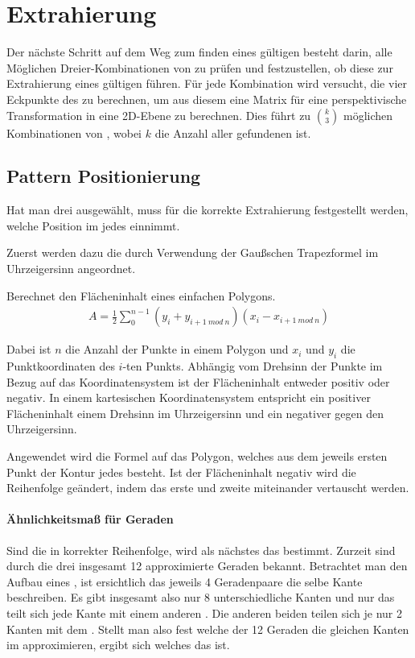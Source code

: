 \chapter{Extrahierung}

Der nächste Schritt auf dem Weg zum finden eines gültigen \QRCodes besteht darin, alle Möglichen Dreier-Kombinationen von \fps zu prüfen und festzustellen, ob diese zur Extrahierung eines gültigen \QRCodes führen. Für jede Kombination wird versucht, die vier Eckpunkte des \QRCodes zu berechnen, um aus diesem eine Matrix für eine perspektivische Transformation in eine 2D-Ebene zu berechnen. Dies führt zu $\binom{k}{3}$ möglichen Kombinationen von \fps, wobei $k$ die Anzahl aller gefundenen \fps ist.

\section{Pattern Positionierung}
Hat man drei \fps ausgewählt, muss für die korrekte Extrahierung festgestellt werden, welche Position im \QRCode jedes \fp einnimmt.

Zuerst werden dazu die \fps durch Verwendung der Gaußschen Trapezformel im Uhrzeigersinn angeordnet.
\begin{theorem}
Berechnet den Flächeninhalt eines einfachen Polygons.
\begin{align}
A=\frac{1}{2} \sum_{0}^{n-1} (y_i + y_{i+1\ mod\ n})(x_i - x_{i+1\ mod\ n})
\end{align}
\end{theorem}
Dabei ist $n$ die Anzahl der Punkte in einem Polygon und $x_i$ und $y_i$ die Punktkoordinaten des $i$-ten Punkts. Abhängig vom Drehsinn der Punkte im Bezug auf das Koordinatensystem ist der Flächeninhalt entweder positiv oder negativ. In einem kartesischen Koordinatensystem entspricht ein positiver Flächeninhalt einem Drehsinn im Uhrzeigersinn und ein negativer gegen den Uhrzeigersinn.

Angewendet wird die Formel auf das Polygon, welches aus dem jeweils ersten Punkt der Kontur jedes \fps besteht. Ist der Flächeninhalt negativ wird die Reihenfolge geändert, indem das erste und zweite \fp miteinander vertauscht werden.
\subsubsection{Ähnlichkeitsmaß für Geraden}
Sind die \fps in korrekter Reihenfolge, wird als nächstes das \olfp bestimmt. Zurzeit sind durch die drei \fps insgesamt 12 approximierte Geraden bekannt. Betrachtet man den Aufbau eines \QRCodes, ist ersichtlich das jeweils 4 Geradenpaare die selbe Kante beschreiben. Es gibt insgesamt also nur 8 unterschiedliche Kanten und nur das \olfp teilt sich jede Kante mit einem anderen \fp. Die anderen beiden \fps teilen sich je nur 2 Kanten mit dem \olfp. Stellt man also fest welche der 12 Geraden die gleichen Kanten im \QRCode approximieren, ergibt sich welches \fp das \olfp ist.

